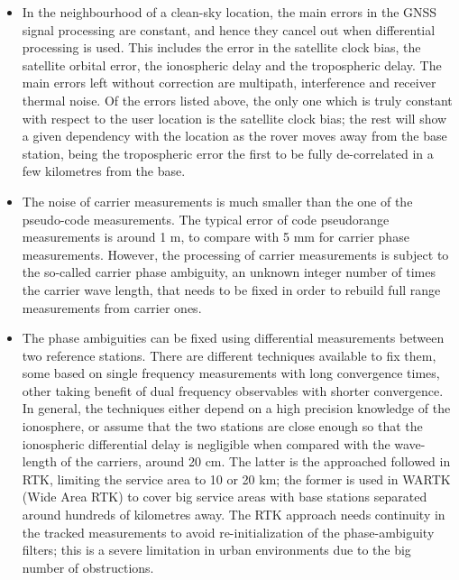 \begin{itemize}
    \item In the neighbourhood of a clean-sky location, the main errors in the GNSS signal processing are constant, and hence they cancel out when differential processing is used. This includes the error in the satellite clock bias, the satellite orbital error, the ionospheric delay and the tropospheric delay. The main errors left without correction are multipath, interference and receiver thermal noise. Of the errors listed above, the only one which is truly constant with respect to the user location is the satellite clock bias; the rest will show a given dependency with the location as the rover moves away from the base station, being the tropospheric error the first to be fully de-correlated in a few kilometres from the base.
    \item The noise of carrier measurements is much smaller than the one of the pseudo-code measurements. The typical error of code pseudorange measurements is around 1 m, to compare with 5 mm for carrier phase measurements. However, the processing of carrier measurements is subject to the so-called carrier phase ambiguity, an unknown integer number of times the carrier wave length, that needs to be fixed in order to rebuild full range measurements from carrier ones.
    \item The phase ambiguities can be fixed using differential measurements between two reference stations. There are different techniques available to fix them, some based on single frequency measurements with long convergence times, other taking benefit of dual frequency observables with shorter convergence. In general, the techniques either depend on a high precision knowledge of the ionosphere, or assume that the two stations are close enough so that the ionospheric differential delay is negligible when compared with the wave-length of the carriers, around 20 cm. The latter is the approached followed in RTK, limiting the service area to 10 or 20 km; the former is used in WARTK (Wide Area RTK) to cover big service areas with base stations separated around hundreds of kilometres away. The RTK approach needs continuity in the tracked measurements to avoid re-initialization of the phase-ambiguity filters; this is a severe limitation in urban environments due to the big number of obstructions.
\end{itemize}

